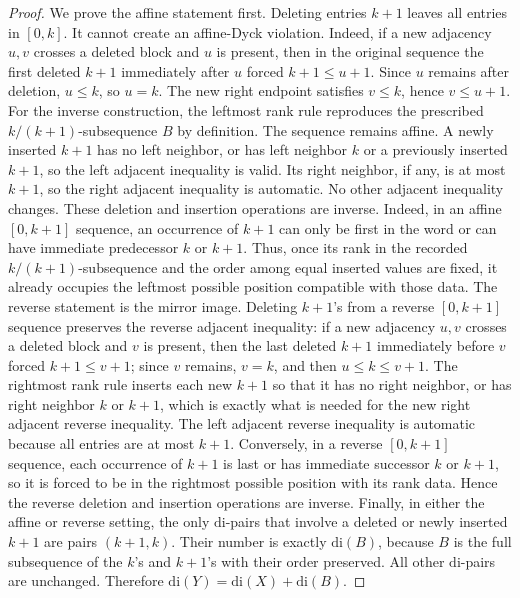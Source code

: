 \documentclass[11pt]{article}
\theoremstyle{plain}
\theoremstyle{definition}
\theoremstyle{remark}
\newcommand{\di}{\mathrm{di}}
\begin{document}
\begin{proof}
We prove the affine statement first.  Deleting entries \(k+1\) leaves all
entries in \([0,k]\).  It cannot create an affine-Dyck violation.  Indeed, if
a new adjacency \(u,v\) crosses a deleted block and \(u\) is present, then in
the original sequence the first deleted \(k+1\) immediately after \(u\) forced
\(k+1\le u+1\).  Since \(u\) remains after deletion, \(u\le k\), so
\(u=k\).  The new right endpoint satisfies \(v\le k\), hence
\(v\le u+1\).
For the inverse construction, the leftmost rank rule reproduces the prescribed
\(k/(k+1)\)-subsequence \(B\) by definition.  The sequence remains affine.  A
newly inserted \(k+1\) has no left neighbor, or has left neighbor \(k\) or a
previously inserted \(k+1\), so the left adjacent inequality is valid.  Its
right neighbor, if any, is at most \(k+1\), so the right adjacent inequality is
automatic.  No other adjacent inequality changes.
These deletion and insertion operations are inverse.  Indeed, in an affine
\([0,k+1]\) sequence, an occurrence of \(k+1\) can only be first in the word or
can have immediate predecessor \(k\) or \(k+1\).  Thus, once its rank in the
recorded \(k/(k+1)\)-subsequence and the order among equal inserted values are
fixed, it already occupies the leftmost possible position compatible with
those data.
The reverse statement is the mirror image.  Deleting \(k+1\)'s from a reverse
\([0,k+1]\) sequence preserves the reverse adjacent inequality: if a new
adjacency \(u,v\) crosses a deleted block and \(v\) is present, then the last
deleted \(k+1\) immediately before \(v\) forced \(k+1\le v+1\); since
\(v\) remains, \(v=k\), and then \(u\le k\le v+1\).  The rightmost rank
rule inserts each new \(k+1\) so that it has no right neighbor, or has right
neighbor \(k\) or \(k+1\), which is exactly what is needed for the new right
adjacent reverse inequality.  The left adjacent reverse inequality is automatic
because all entries are at most \(k+1\).  Conversely, in a reverse
\([0,k+1]\) sequence, each occurrence of \(k+1\) is last or has immediate
successor \(k\) or \(k+1\), so it is forced to be in the rightmost possible
position with its rank data.  Hence the reverse deletion and insertion
operations are inverse.
Finally, in either the affine or reverse setting, the only \(\di\)-pairs that
involve a deleted or newly inserted \(k+1\) are pairs \((k+1,k)\).  Their
number is exactly \(\di(B)\), because \(B\) is the full subsequence of the
\(k\)'s and \(k+1\)'s with their order preserved.  All other \(\di\)-pairs are
unchanged.  Therefore \(\di(Y)=\di(X)+\di(B)\).
\end{proof}
\end{document}
